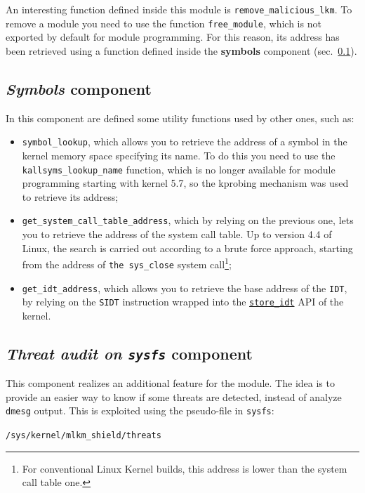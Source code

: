 \documentclass{article}
\begin{document}
	An interesting function defined inside this module is \texttt{remove\_malicious\_lkm}. To remove a module you need
	to use the function \texttt{free\_module}, which is not exported by default for module programming. For this
	reason, its address has been retrieved using a function defined inside the \textbf{symbols} component
	(sec.~\ref{sec:symbols}).

	\subsection{\emph{Symbols} component}\label{sec:symbols}
	In this component are defined some utility functions used by other ones, such as:
	\begin{itemize}
		\item \texttt{symbol\_lookup}, which allows you to retrieve the address of a symbol in the kernel memory space
		specifying its name. To do this you need to use the \texttt{kallsyms\_lookup\_name} function, which is no
		longer available for module programming starting with kernel 5.7, so the kprobing mechanism was used to
		retrieve its address;
		\item \texttt{get\_system\_call\_table\_address}, which by relying on the previous one, lets you to retrieve
		the address of the system call table. Up to version 4.4 of Linux, the search is carried out according to a
		brute force approach, starting from the address of \texttt{the sys\_close} system call\footnote{For
			conventional Linux Kernel builds, this address is lower than the system call table one.};
		\item \texttt{get\_idt\_address}, which allows you to retrieve the base address of the \texttt{IDT}, by relying
		on the \texttt{SIDT} instruction wrapped into the
		\href{https://elixir.bootlin.com/linux/latest/source/arch/x86/include/asm/desc.h#L223}{\texttt{store\_idt}} API
		of the kernel.
	\end{itemize}

	\subsection{\emph{Threat audit on \texttt{sysfs}} component}\label{sec:threats}
	This component realizes an additional feature for the module. The idea is to provide an easier way to know if some
	threats are detected, instead of analyze \texttt{dmesg} output. This is exploited using the pseudo-file in
	\texttt{sysfs}:

	\centerline{\texttt{/sys/kernel/mlkm\_shield/threats}}
\end{document}
